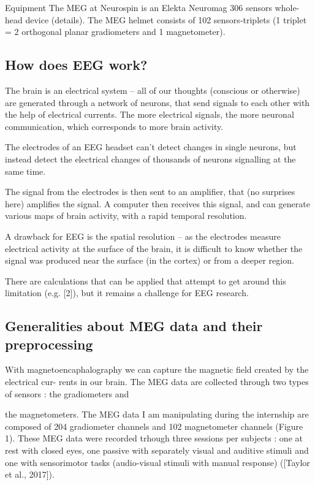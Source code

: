 Equipment
The MEG at Neurospin is an Elekta Neuromag 306 sensors whole-head device (details). The MEG helmet consists of 102 sensors-triplets (1 triplet = 2 orthogonal planar gradiometers and 1 magnetometer).


\subsection{How does EEG work?}

The brain is an electrical system – all of our thoughts (conscious or otherwise) are generated through a network of neurons, that send signals to each other with the help of electrical currents. The more electrical signals, the more neuronal communication, which corresponds to more brain activity.

The electrodes of an EEG headset can’t detect changes in single neurons, but instead detect the electrical changes of thousands of neurons signalling at the same time.

The signal from the electrodes is then sent to an amplifier, that (no surprises here) amplifies the signal. A computer then receives this signal, and can generate various maps of brain activity, with a rapid temporal resolution.

A drawback for EEG is the spatial resolution – as the electrodes measure electrical activity at the surface of the brain, it is difficult to know whether the signal was produced near the surface (in the cortex) or from a deeper region.

There are calculations that can be applied that attempt to get around this limitation (e.g. [2]), but it remains a challenge for EEG research.


\subsection{Generalities about MEG data and their preprocessing}

With magnetoencaphalography we can capture the magnetic field created by the electrical cur-
rents in our brain. The MEG data are collected through two types of sensors : the gradiometers and

the magnetometers. The MEG data I am manipulating during the internship are composed of 204
gradiometer channels and 102 magnetometer channels (Figure 1). These MEG data were recorded
trhough three sessions per subjects : one at rest with closed eyes, one passive with separately visual
and auditive stimuli and one with sensorimotor tasks (audio-visual stimuli with manual response)
([Taylor et al., 2017]).


